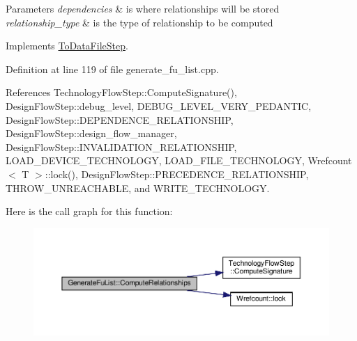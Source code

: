 \begin{DoxyParams}{Parameters}
{\em dependencies} & is where relationships will be stored \\
\hline
{\em relationship\+\_\+type} & is the type of relationship to be computed \\
\hline
\end{DoxyParams}


Implements \hyperlink{classToDataFileStep_aa2644f2c16d52ff381a6c52eef19c7c5}{To\+Data\+File\+Step}.



Definition at line 119 of file generate\+\_\+fu\+\_\+list.\+cpp.



References Technology\+Flow\+Step\+::\+Compute\+Signature(), Design\+Flow\+Step\+::debug\+\_\+level, D\+E\+B\+U\+G\+\_\+\+L\+E\+V\+E\+L\+\_\+\+V\+E\+R\+Y\+\_\+\+P\+E\+D\+A\+N\+T\+IC, Design\+Flow\+Step\+::\+D\+E\+P\+E\+N\+D\+E\+N\+C\+E\+\_\+\+R\+E\+L\+A\+T\+I\+O\+N\+S\+H\+IP, Design\+Flow\+Step\+::design\+\_\+flow\+\_\+manager, Design\+Flow\+Step\+::\+I\+N\+V\+A\+L\+I\+D\+A\+T\+I\+O\+N\+\_\+\+R\+E\+L\+A\+T\+I\+O\+N\+S\+H\+IP, L\+O\+A\+D\+\_\+\+D\+E\+V\+I\+C\+E\+\_\+\+T\+E\+C\+H\+N\+O\+L\+O\+GY, L\+O\+A\+D\+\_\+\+F\+I\+L\+E\+\_\+\+T\+E\+C\+H\+N\+O\+L\+O\+GY, Wrefcount$<$ T $>$\+::lock(), Design\+Flow\+Step\+::\+P\+R\+E\+C\+E\+D\+E\+N\+C\+E\+\_\+\+R\+E\+L\+A\+T\+I\+O\+N\+S\+H\+IP, T\+H\+R\+O\+W\+\_\+\+U\+N\+R\+E\+A\+C\+H\+A\+B\+LE, and W\+R\+I\+T\+E\+\_\+\+T\+E\+C\+H\+N\+O\+L\+O\+GY.

Here is the call graph for this function\+:
\nopagebreak
\begin{figure}[H]
\begin{center}
\leavevmode
\includegraphics[width=350pt]{db/dea/classGenerateFuList_a3651813235effdc39f39dd064571a135_cgraph}
\end{center}
\end{figure}
\mbox{\label{classGenerateFuList_adadbe6658c33d77bb24fd0e8b1516a65}} 
